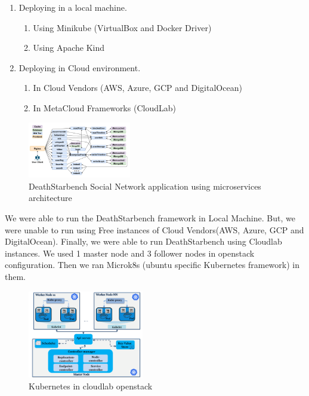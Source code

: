 \documentclass[conference]{IEEEtran}
\begin{document}
\begin{enumerate}
    \item Deploying in a local machine.
        \begin{enumerate}
            \item Using Minikube (VirtualBox and Docker Driver)
            \item Using Apache Kind
        \end{enumerate}
    \item Deploying in Cloud environment.
        \begin{enumerate}
            \item In Cloud Vendors (AWS, Azure, GCP and DigitalOcean)
            \item In MetaCloud Frameworks (CloudLab)
        \end{enumerate}
\end{enumerate}


\begin{figure}[!h]
    \begin{center}
        \includegraphics[width=0.4\textwidth]{figures/social-network.png}
    \end{center}
    \caption{DeathStarbench\cite{bDeathStarBench} Social Network application using microservices architecture}
    \label{fig:social-network}
\end{figure}


We were able to run the DeathStarbench framework in Local Machine. But, we were unable to run using Free instances of Cloud Vendors(AWS, Azure, GCP and DigitalOcean). Finally, we were able to run DeathStarbench using Cloudlab instances. We used 1 master node and 3 follower nodes in openstack \cite{bstack} configuration. Then we ran Microk8s (ubuntu specific Kubernetes framework) in them. 

\begin{figure}[!h]
    \begin{center}
        \includegraphics[width=0.45\textwidth]{figures/openstack-kube.png}
    \end{center}
    \caption{Kubernetes in cloudlab openstack}
    \label{fig:kube-cloudlab}
\end{figure}
\end{document}

